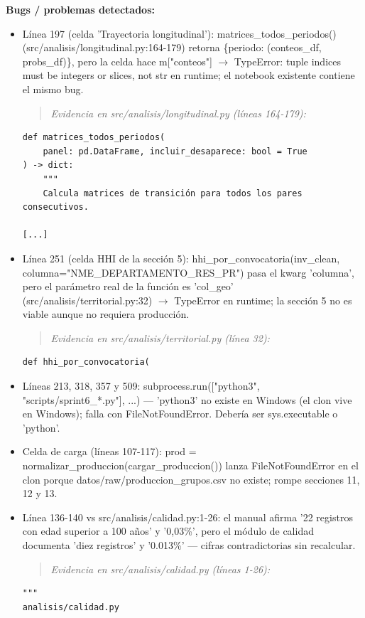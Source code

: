 \begin{tcolorbox}[riesgo]
\textbf{Bugs / problemas detectados:}
\begin{itemize}
  \item Línea 197 (celda 'Trayectoria longitudinal'): matrices\_todos\_periodos() (src/analisis/longitudinal.py:164-179) retorna \{periodo: (conteos\_df, probs\_df)\}, pero la celda hace m["conteos"] $\rightarrow$ TypeError: tuple indices must be integers or slices, not str en runtime; el notebook existente contiene el mismo bug.
\begin{quote}\footnotesize\ttfamily
\noindent\emph{Evidencia en src/analisis/longitudinal.py (líneas 164-179):}
\end{quote}
\begin{lstlisting}
def matrices_todos_periodos(
    panel: pd.DataFrame, incluir_desaparece: bool = True
) -> dict:
    """
    Calcula matrices de transición para todos los pares consecutivos.

[...]
\end{lstlisting}

  \item Línea 251 (celda HHI de la sección 5): hhi\_por\_convocatoria(inv\_clean, columna="NME\_DEPARTAMENTO\_RES\_PR") pasa el kwarg 'columna', pero el parámetro real de la función es 'col\_geo' (src/analisis/territorial.py:32) $\rightarrow$ TypeError en runtime; la sección 5 no es viable aunque no requiera producción.
\begin{quote}\footnotesize\ttfamily
\noindent\emph{Evidencia en src/analisis/territorial.py (línea 32):}
\end{quote}
\begin{lstlisting}
def hhi_por_convocatoria(
\end{lstlisting}

  \item Líneas 213, 318, 357 y 509: subprocess.run(["python3", "scripts/sprint6\_*.py"], ...) --- 'python3' no existe en Windows (el clon vive en Windows); falla con FileNotFoundError. Debería ser sys.executable o 'python'.
  \item Celda de carga (líneas 107-117): prod = normalizar\_produccion(cargar\_produccion()) lanza FileNotFoundError en el clon porque datos/raw/produccion\_grupos.csv no existe; rompe secciones 11, 12 y 13.
  \item Línea 136-140 vs src/analisis/calidad.py:1-26: el manual afirma '22 registros con edad superior a 100 años' y '0,03\%', pero el módulo de calidad documenta 'diez registros' y '0.013\%' --- cifras contradictorias sin recalcular.
\begin{quote}\footnotesize\ttfamily
\noindent\emph{Evidencia en src/analisis/calidad.py (líneas 1-26):}
\end{quote}
\begin{lstlisting}
"""
analisis/calidad.py


\end{lstlisting}
\end{itemize}
\end{tcolorbox}

